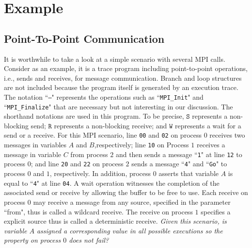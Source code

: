 \section{Example}\label{sec:example}
\subsection{Point-To-Point Communication}
It is worthwhile to take a look at a simple scenario with several MPI calls. Consider  as an example, it is a trace program including point-to-point operations, i.e., sends and receives, for message communication. Branch and loop structures are not included because the program itself is generated by an execution trace. The notation ``\texttt{---}" represents the operations such as ``\texttt{MPI\_Init}" and ``\texttt{MPI\_Finalize}" that are necessary but not interesting in our discussion. The shorthand notations are used in this program. To be precise, $\mathtt{S}$ represents a non-blocking send; $\mathtt{R}$ represents a non-blocking receive; and $\mathtt{W}$ represents a wait for a send or a receive. For this MPI scenario, line \texttt{00} and \texttt{02} on process $0$ receives two messages in variables $A$ and $B$,respectively; line \texttt{10} on Process $1$ receives a message in variable $C$ from process $2$ and then sends a message ``\texttt{1}" at line \texttt{12} to process $0$; and line \texttt{20} and \texttt{22} on process $2$ sends a message ``\texttt{4}" and ``\texttt{Go}" to process $0$ and $1$, respectively. In addition, process $0$ asserts that variable $A$ is equal to ``\texttt{4}" at line \texttt{04}. A wait operation witnesses the completion of the associated send or receive by allowing the buffer to be free to use. Each receive on process $0$ may receive a message from any source, specified in the parameter ``from", thus is called a wildcard receive. The receive on process $1$ specifies a explicit source thus is called a deterministic receive. \textit{Given this scenario, is variable $A$ assigned a corresponding value in all possible executions so the property on process $0$ does not fail?}

